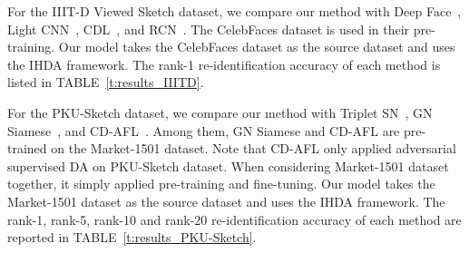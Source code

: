 \documentclass[journal]{IEEEtran}
\begin{document}
For the IIIT-D Viewed Sketch dataset, we compare our method with Deep Face~\cite{parkhi2015deep}, Light CNN~\cite{wu2018light}, CDL~\cite{wu2018coupled}, and RCN~\cite{deng2019residual}. The CelebFaces dataset is used in their pre-training. Our model takes the CelebFaces dataset as the source dataset and uses the IHDA framework. The rank-1 re-identification accuracy of each method is listed in TABLE~\ref{t:results_IIITD}.
\tabcolsep=4pt
\begin{table}[!ht]
\centering
\caption{The performance of sketch-to-photo retrieval on the IIIT-D Viewed Sketch dataset.}
\label{t:results_IIITD}
\end{table}

For the PKU-Sketch dataset, we compare our method with Triplet SN~\cite{yu2016sketch}, GN Siamese~\cite{SangkloyBHH16}, and CD-AFL~\cite{pang2018cross}. Among them, GN Siamese and CD-AFL are pre-trained on the Market-1501 dataset. Note that CD-AFL only applied adversarial supervised DA on PKU-Sketch dataset. When considering Market-1501 dataset together, it simply applied pre-training and fine-tuning. Our model takes the Market-1501 dataset as the source dataset and uses the IHDA framework. The rank-1, rank-5, rank-10 and rank-20 re-identification accuracy of each method are reported in TABLE~\ref{t:results_PKU-Sketch}.
\end{document}
